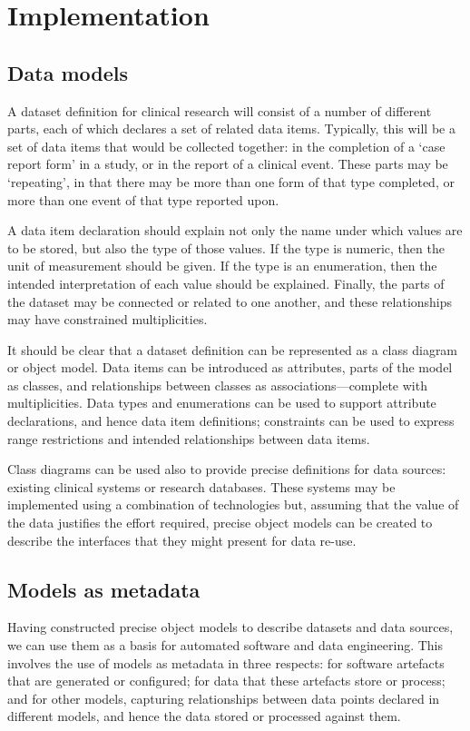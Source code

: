 \section{Implementation}


\subsection{Data models}

A dataset definition for clinical research will consist of a number of
different parts, each of which declares a set of related data items.
Typically, this will be a set of data items that would be collected
together: in the completion of a `case report form' in a study, or in
the report of a clinical event.  These parts may be `repeating', in
that there may be more than one form of that type completed, or more
than one event of that type reported upon.  

A data item declaration should explain not only the name under which
values are to be stored, but also the type of those values.  If the
type is numeric, then the unit of measurement should be given.  If the
type is an enumeration, then the intended interpretation of each value
should be explained.  Finally, the parts of the dataset may be
connected or related to one another, and these relationships may have
constrained multiplicities.

It should be clear that a dataset definition can be represented as a
class diagram or object model.  Data items can be introduced as
attributes, parts of the model as classes, and relationships between
classes as associations---complete with multiplicities.  Data types
and enumerations can be used to support attribute declarations, and
hence data item definitions; constraints can be used to express range
restrictions and intended relationships between data items.

Class diagrams can be used also to provide precise definitions for
data sources: existing clinical systems or research databases.  These
systems may be implemented using a combination of technologies but,
assuming that the value of the data justifies the effort required,
precise object models can be created to describe the interfaces that
they might present for data re-use. 

\subsection{Models as metadata}

Having constructed precise object models to describe datasets and data
sources, we can use them as a basis for automated software and data
engineering.  This involves the use of models as metadata in three
respects: for software artefacts that are generated or configured; for
data that these artefacts store or process; and for other models,
capturing relationships between data points declared in different
models, and hence the data stored or processed against them.

